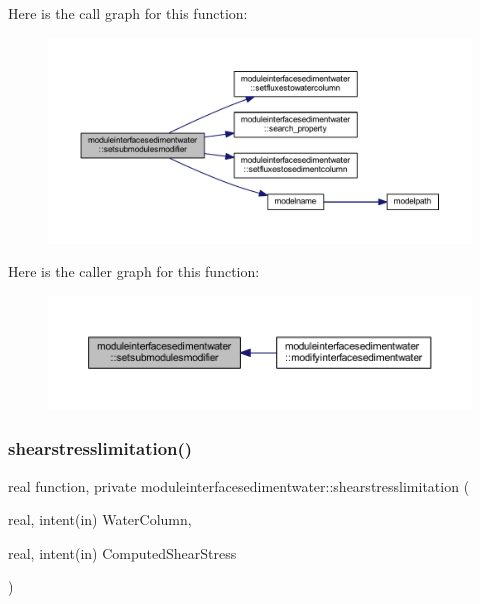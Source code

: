 Here is the call graph for this function\+:\nopagebreak
\begin{figure}[H]
\begin{center}
\leavevmode
\includegraphics[width=350pt]{namespacemoduleinterfacesedimentwater_ae902470f5fe9f7c4442249a86b00147e_cgraph}
\end{center}
\end{figure}
Here is the caller graph for this function\+:\nopagebreak
\begin{figure}[H]
\begin{center}
\leavevmode
\includegraphics[width=350pt]{namespacemoduleinterfacesedimentwater_ae902470f5fe9f7c4442249a86b00147e_icgraph}
\end{center}
\end{figure}
\mbox{\label{namespacemoduleinterfacesedimentwater_ab99914cb84ad28c9ff3848ff2f65536b}} 
\subsubsection{\texorpdfstring{shearstresslimitation()}{shearstresslimitation()}}
{\footnotesize\ttfamily real function, private moduleinterfacesedimentwater\+::shearstresslimitation (\begin{DoxyParamCaption}\item[{real, intent(in)}]{Water\+Column,  }\item[{real, intent(in)}]{Computed\+Shear\+Stress }\end{DoxyParamCaption})\hspace{0.3cm}{\ttfamily [private]}}

